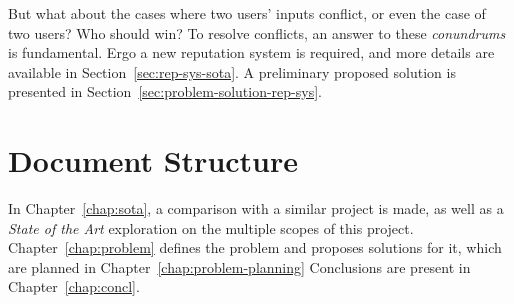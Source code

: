 But what about the cases where two  users' inputs conflict, or even the case of two  users? Who should win? To resolve conflicts, an answer to these \textit{conundrums} is fundamental. Ergo a new reputation system is required, and more details are available in Section~\ref{sec:rep-sys-sota}. A preliminary proposed solution is presented in Section~\ref{sec:problem-solution-rep-sys}.

\section{Document Structure}

In Chapter~\ref{chap:sota}, a comparison with a similar project is made, as well as a \textit{State of the Art} exploration on the multiple scopes of this project. Chapter~\ref{chap:problem} defines the problem and proposes solutions for it, which are planned in Chapter~\ref{chap:problem-planning} Conclusions are present in Chapter~\ref{chap:concl}. 